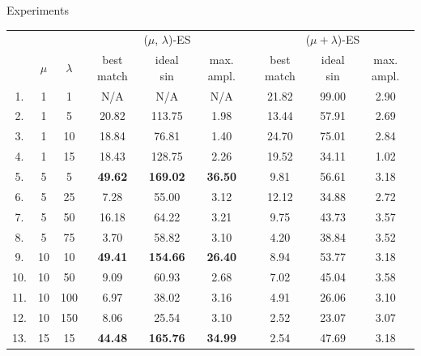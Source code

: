 \documentclass[10pt,xcolor=pdflatex]{beamer}
\begin{document}
\begin{frame}{Experiments}
\begin{table}[H]
\centering
\begin{adjustbox}{max width=\textwidth}
\begin{tabular}{@{}ccccccccc@{}}
\toprule
    &       &           & \multicolumn{3}{c}{($\mu$, $\lambda$)-ES} & \multicolumn{3}{c}{($\mu + \lambda$)-ES} \\
   \cmidrule(lr){4-6} \cmidrule(lr){7-9}
    & $\mu$ & $\lambda$ & best match & ideal sin & max. ampl.       & best match & ideal sin  & max. ampl.     \\
   \midrule
1.  & 1     & 1         & N/A        & N/A       & N/A              & 21.82      & 99.00      & 2.90           \\
2.  & 1     & 5         & 20.82      & 113.75    & 1.98             & 13.44      & 57.91      & 2.69           \\
3.  & 1     & 10        & 18.84      & 76.81     & 1.40             & 24.70      & 75.01      & 2.84           \\
4.  & 1     & 15        & 18.43      & 128.75    & 2.26             & 19.52      & 34.11      & 1.02           \\
5.  & 5     & 5         & \textbf{49.62}      & \textbf{169.02}    & \textbf{36.50}            & 9.81       & 56.61      & 3.18           \\
6.  & 5     & 25        & 7.28       & 55.00     & 3.12             & 12.12      & 34.88      & 2.72           \\
7.  & 5     & 50        & 16.18      & 64.22     & 3.21             & 9.75       & 43.73      & 3.57           \\
8.  & 5     & 75        & 3.70       & 58.82     & 3.10             & 4.20       & 38.84      & 3.52           \\
9.  & 10    & 10        & \textbf{49.41}      & \textbf{154.66}    & \textbf{26.40}            & 8.94       & 53.77      & 3.18           \\
10. & 10    & 50        & 9.09       & 60.93     & 2.68             & 7.02       & 45.04      & 3.58           \\
11. & 10    & 100       & 6.97       & 38.02     & 3.16             & 4.91       & 26.06      & 3.10           \\
12. & 10    & 150       & 8.06       & 25.54     & 3.10             & 2.52       & 23.07      & 3.07           \\
13. & 15    & 15        & \textbf{44.48}      & \textbf{165.76}    & \textbf{34.99}            & 2.54       & 47.69      & 3.18           \\

\end{tabular}
\end{adjustbox}
\end{table}
\end{frame}
\end{document}
